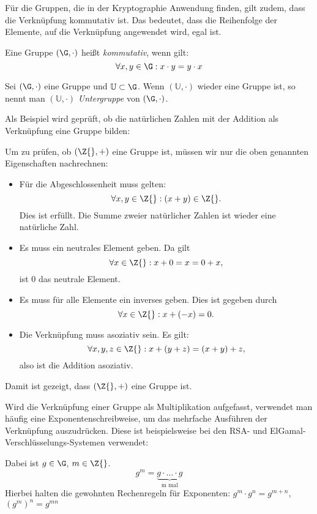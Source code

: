Für die Gruppen, die in der Kryptographie Anwendung finden, gilt zudem,
dass die Verknüpfung kommutativ ist. Das bedeutet, dass die Reihenfolge
der Elemente, auf die Verknüpfung angewendet wird, egal ist.
\begin{definition}
  Eine Gruppe $(\G, \cdot)$ heißt \textit{kommutativ}, wenn gilt:
\[
  \forall x, y \in \G: x \cdot y = y \cdot x
\]
\end{definition}


\begin{definition}[Untergruppe]
  Sei $(\G, \cdot)$ eine Gruppe und $\mathbb{U} \subset \G$. Wenn
  $(\mathbb{U}, \cdot)$ wieder eine Gruppe ist, so nennt man $(\mathbb{U},
  \cdot)$ \textit{Untergruppe} von $(\G, \cdot)$.
\end{definition}


Als Beispiel wird geprüft, ob die natürlichen Zahlen mit der Addition
als Verknüpfung eine Gruppe bilden:
\begin{beispiel}
  Um zu prüfen, ob \((\Z{}, +)\) eine Gruppe ist, müssen
  wir nur die oben genannten Eigenschaften nachrechnen:
  \begin{itemize}
  \item Für die Abgeschlossenheit muss gelten: 
    \[\forall x, y \in \Z{}: (x+y)\in \Z{}. \] 
     Dies ist erfüllt. Die Summe zweier natürlicher Zahlen ist wieder
     eine natürliche Zahl.
  \item Es muss ein neutrales Element geben. Da gilt 
    \[\forall x \in \Z{}: x+0 = x = 0+x, \] ist $0$ das neutrale Element.
  \item Es muss für alle Elemente ein inverses geben. Dies ist gegeben
    durch \[\forall x \in \Z{}: x + (-x) = 0.\]
  \item Die Verknüpfung muss asoziativ sein. Es gilt:
    \[\forall x, y, z \in \Z{}: x + (y+z)=(x+y)+z,\] also ist die
    Addition asoziativ.
  \end{itemize}
  Damit ist gezeigt, dass $(\Z{}, +)$ eine Gruppe ist.
\end{beispiel}


Wird die Verknüpfung einer Gruppe als Multiplikation aufgefasst,
verwendet man häufig eine Exponentenschreibweise, um das mehrfache
Ausführen der Verknüpfung auszudrücken. Diese ist beispielsweise bei den
RSA- und ElGamal-Verschlüsselungs-Systemen verwendet:

\begin{definition}
 Dabei ist $g\in \G$, $m \in \Z{}$.
\[ g^m = \underbrace{g \cdot \dotsc \cdot g}_{\text{m mal}} \]
Hierbei halten die gewohnten Rechenregeln für Exponenten: $g^m\cdot g^n =
g^{m+n}$, $(g^m)^n = g^{mn}$
\end{definition}

